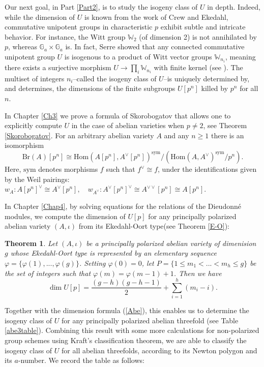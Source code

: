 \documentclass[a4paper,12pt,twoside]{report}
\newtheorem*{theorem*}{Theorem}
\newcommand{\G}{\mathbb{G}}
\newcommand{\Br}{\mathrm{Br}}
\newcommand{\Hom}{\mathrm{Hom}}
\newcommand{\W}{\mathbb{W}}
\newcommand{\sym}{\mathrm{sym}}
\begin{document}
Our next goal, in Part \ref{Part2}, is to study the isogeny class of $U$ in depth. 
Indeed, while the dimension of $U$ is known from the work of Crew and Ekedahl, commutative unipotent groups in characteristic $p$ 
exhibit subtle and intricate behavior. For instance, the Witt group $\W_2$ (of dimension 2) is 
not annihilated by $p$, whereas $\G_a \times \G_a$ is. In fact, Serre showed that any connected 
commutative unipotent group $U$ is isogenous to a product of Witt vector groups $\W_{n_i}$, 
meaning there exists a surjective morphism $U \to \prod_i \W_{n_i}$ with finite kernel (see \cite[Theorem VII.2.10.1]{Se2}). 
The multiset of integers ${n_i}$--called the isogeny class of $U$--is uniquely determined by, 
and determines, the dimensions of the finite subgroups $U[p^n]$ killed by $p^n$ for all $n$.

In Chapter \ref{Ch3} we prove a formula of Skorobogatov that
allows one to explicitly compute $U$ in the case of abelian varieties when $p \neq 2$,
see Theorem \ref{Skorobogatov}. 
For an arbitrary abelian variety $A$ and any $n\geq 1$ there is an isomorphism
\[\Br(A)[p^n]\cong \Hom(A[p^n],A^\vee[p^n])^{\sym}/(\Hom(A,A^\vee)^{\sym}/p^n).\]
Here, $\sym$ denotes morphisms $f$ such that $f^\vee\cong f$, 
under the identifications given by the Weil pairings: 
\(w_A:A[p^n]^{\vee}\cong A^{\vee}[p^n], \quad w_{A^\vee}: A^{\vee}[p^n]^{\vee}\cong A^{\vee\vee}[p^n]\cong A[p^n].\)

In Chapter \ref{Chap4}, by solving equations for the relations of the Dieudonné modules, 
we compute the dimension of $U[p]$ for any principally polarized abelian variety $(A, \iota)$ 
from its Ekedahl-Oort type(see Theorem \ref{E-O}): 
\begin{theorem*}
Let $(A,\iota)$ be a principally polarized abelian variety of dimenision $g$  whose
Ekedahl-Oort type is represented by an elementary sequence $\varphi=\{\varphi(1),...,\varphi(g)\}$.
Setting $\varphi(0)=0$, let $P=\{1\leqslant m_1<...<m_h\leqslant g\}$ be the set of integers such that $\varphi(m)=\varphi(m-1)+1$. Then we have
    \[\dim U[p]=\frac{(g-h)(g-h-1)}{2}+\sum_{i=1}^h (m_i-i).\]
\end{theorem*}

Together with the dimension formula (\ref{Abe}), this enables us to determine the isogeny class of $U$ 
for any principally polarized abelian threefold (see Table \ref{abe3table}).
Combining this result with some more calculations for non-polarized group schemes using Kraft's classification theorem, 
we are able to classify the isogeny class of $U$ for all abelian threefolds, 
according to its Newton polygon and its $a$-number. We record the table as follows:
\end{document}
